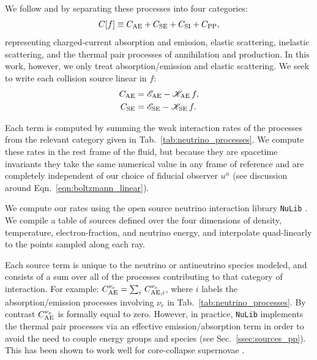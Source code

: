 \documentclass[aps,floatfix,prd,superscriptaddress,twocolumn]{revtex4-1}
\begin{document}
We follow
\cite{brue1985-core_collapse} and \cite[Sec.~4]{shib2011-truncated_moment}
by separating these processes into four categories:
\begin{equation}
  \label{eqn:four_sources}
  C[f] \equiv C_{\rm AE} + C_{\rm SE} + C_{\rm SI} + C_{\rm PP},
\end{equation}
representing charged-current absorption and emission, elastic scattering,
inelastic scattering, and the thermal pair processes of annihilation and
production. In this work, however, we only treat absorption/emission
and elastic scattering.
We seek to write each collision source linear in $f$:
\begin{align}
  \label{eqn:sources_cae}
  C_{\rm AE}
  &= \mathscr{E}_{\rm AE} - \mathscr{K}_{\rm AE}\, f, \\
  \label{eqn:sources_cse}
  C_{\rm SE}
  &= \mathscr{E}_{\rm SE} - \mathscr{K}_{\rm SE}\, f.
\end{align}

Each term
is computed by summing the weak interaction rates of the processes from the
relevant category given in Tab.~\ref{tab:neutrino_processes}.
We compute these rates in the rest frame of the fluid,
but because they are spacetime invariants
they take the same numerical value in any frame of reference
and are completely independent of our choice of fiducial observer $u^\alpha$
(see discussion around Eqn.~\ref{eqn:boltzmann_linear}).

We compute our rates using the open source neutrino interaction
library \lstinline{NuLib} \cite{ocon2015-gr1d_with_nu}.
We compile a table of sources defined over the four dimensions of
density, temperature, electron-fraction, and neutrino energy, and
interpolate quad-linearly to the points sampled along each ray.

Each source term is unique to the neutrino or antineutrino species modeled,
and consists of a sum over all of the processes contributing to that
category of interaction. For example:
$C^{\nu_e}_{{\rm AE}} = \sum_i\,C^{\nu_e}_{{\rm AE},i}$,
where $i$ labels the absorption/emission processes involving $\nu_e$
in Tab.~\ref{tab:neutrino_processes}.
By contrast $C^{\nu_x}_{{\rm AE}}$ is formally equal to zero.
However, in practice, \lstinline{NuLib} implements the thermal pair processes
via an effective emission/absorption term in order to avoid the need
to couple energy groups and species (see Sec.~\ref{ssec:sources_pp}).
This has been shown to work well for core-collapse supernovae
\cite{ocon2015-gr1d_with_nu}.
\end{document}
